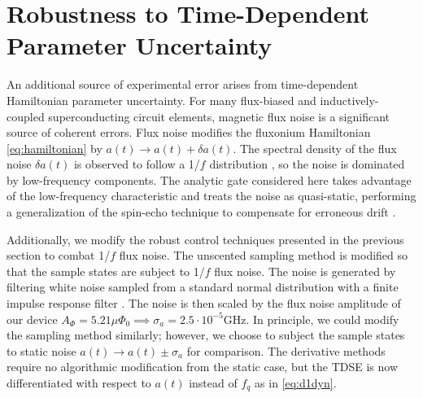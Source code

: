 \section{Robustness to Time-Dependent Parameter Uncertainty \label{sec:stochastic}}
An additional source of experimental error arises from time-dependent
Hamiltonian parameter uncertainty. For many flux-biased and inductively-coupled
superconducting circuit elements, magnetic flux noise is a significant
source of coherent errors. Flux noise
modifies the fluxonium Hamiltonian \eqref{eq:hamiltonian}
by $a(t) \rightarrow a(t) + \delta a(t)$.
The spectral density of the flux noise $\delta a(t)$ is observed to
follow a 1/$f$ distribution
\cite{bialczak20071f, koch2007model,
  yoshihara2006decoherence, yoshihara2010correlated},
so the noise is dominated by low-frequency components.
The analytic gate considered here
takes advantage of the low-frequency characteristic and
treats the noise as quasi-static, performing a generalization of the spin-echo
technique to compensate for erroneous drift \cite{hahn1952spin, meiboom1958modified}.

Additionally, we modify the robust control techniques presented
in the previous section to combat 1/$f$ flux noise.
The unscented sampling method is modified so that the sample states
are subject to 1/$f$ flux noise. The noise
is generated by filtering white noise sampled from a standard
normal distribution with a finite impulse response filter \cite{saspweb2011}.
The noise is then scaled by the 
flux noise amplitude of our device $A_{\Phi} = 5.21 \mu \Phi_{0} \implies
\sigma_{a} = 2.5 \cdot 10^{-5} \textrm{GHz}$.
In principle, we could modify the sampling method
similarly; however, we choose to subject the sample states
to static noise
$a(t) \rightarrow a(t) \pm \sigma_{a}$
for comparison. The derivative methods require no algorithmic modification
from the static case, but the TDSE is now differentiated with respect
to $a(t)$ instead of $f_{q}$ as in \eqref{eq:d1dyn}.

